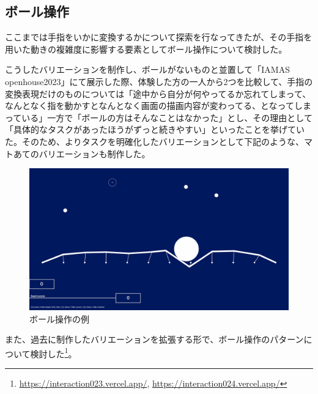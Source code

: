 \subsection{ボール操作}
ここまでは手指をいかに変換するかについて探索を行なってきたが、その手指を用いた動きの複雑度に影響する要素としてボール操作について検討した。

こうしたバリエーションを制作し、ボールがないものと並置して「IAMAS openhouse2023」にて展示した際、体験した方の一人から2つを比較して、手指の変換表現だけのものについては「途中から自分が何やってるか忘れてしまって、なんとなく指を動かすとなんとなく画面の描画内容が変わってる、となってしまっている」一方で「ボールの方はそんなことはなかった」とし、その理由として「具体的なタスクがあったほうがずっと続きやすい」といったことを挙げていた。そのため、よりタスクを明確化したバリエーションとして下記のような、マトあてのバリエーションも制作した。

\begin{figure}[H]
  \centering
  \includegraphics[width=15cm]{img/ball_overview.png}
  \caption{ボール操作の例}
  \label{fig:ball_overview}
\end{figure}

また、過去に制作したバリエーションを拡張する形で、ボール操作のパターンについて検討した\footnote{\url{https://interaction023.vercel.app/}, \url{https://interaction024.vercel.app/}}。

